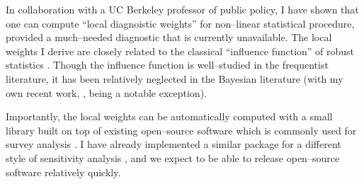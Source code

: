 In collaboration with a UC Berkeley professor of public policy, I have shown
that one can compute ``local diagnoistic weights'' for non--linear statistical
procedure, provided a much--needed diagnostic that is currently unavailable. The
local weights I derive are closely related to the classical ``influence
function'' of robust statistics
\citep{mises:1947:asymptotic,hampel:1986:robust,giordano:2019:swiss}.  Though
the influence function is well--studied in the frequentist literature, it has
been relatively neglected in the Bayesian literature (with my own recent work,
\citet{giordano:2023:bayesij}, being a notable exception).

Importantly, the local weights can be automatically computed with a small
library built on top of existing open--source software which is commonly used
for survey analysis \citep{lopezmartin:2022:mrptutorial}.  I have already
implemented a similar package for a different style of sensitivity analysis
\citep{giordano:2024:zaminfluence}, and we expect to be able to release
open--source software relatively quickly.  









\newpage





